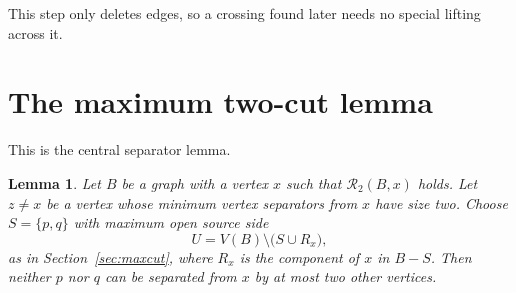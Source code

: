 \documentclass[11pt]{article}
\newtheorem{lemma}{Lemma}
\newcommand{\cR}{\mathcal R}
\begin{document}
This step only deletes edges, so a crossing found later needs no special
lifting across it.

\section{The maximum two-cut lemma}\label{sec:twocut}

This is the central separator lemma.

\begin{lemma}\label{lem:twocut}
Let $B$ be a graph with a vertex $x$ such that $\cR_2(B,x)$ holds. Let $z\ne x$
be a vertex whose minimum vertex separators from $x$ have size two. Choose
$S=\{p,q\}$ with maximum open source side
\begin{equation*}
U=V(B)\setminus\bigl(S\cup R_x\bigr),
\end{equation*}
as in Section~\ref{sec:maxcut}, where $R_x$ is the component of $x$ in $B-S$.
Then neither $p$ nor $q$ can be separated from $x$ by at most two other
vertices.
\end{lemma}
\end{document}
